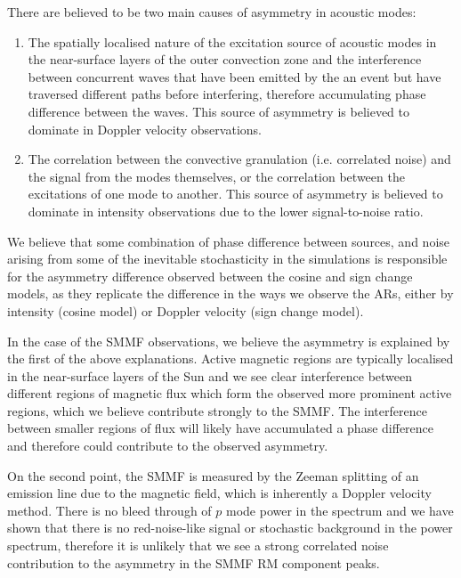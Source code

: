 There are believed to be two main causes of asymmetry in acoustic modes:

\begin{enumerate}
	\item{The spatially localised nature of the excitation source of acoustic modes in the near-surface layers of the outer convection zone and the interference between concurrent waves that have been emitted by the an event but have traversed different paths before interfering, therefore accumulating phase difference between the waves. This source of asymmetry is believed to dominate in Doppler velocity observations.}
	
	\item{The correlation between the convective granulation (i.e. correlated noise) and the signal from the modes themselves, or the correlation between the excitations of one mode to another. This source of asymmetry is believed to dominate in intensity observations due to the lower signal-to-noise ratio.}
\end{enumerate}

We believe that some combination of phase difference between sources, and noise arising from some of the inevitable stochasticity in the simulations is responsible for the asymmetry difference observed between the cosine and sign change models, as they replicate the difference in the ways we observe the ARs, either by intensity (cosine model) or Doppler velocity (sign change model).

In the case of the SMMF observations, we believe the asymmetry is explained by the first of the above explanations. Active magnetic regions are typically localised in the near-surface layers of the Sun and we see clear interference between different regions of magnetic flux which form the observed more prominent active regions, which we believe contribute strongly to the SMMF. The interference between smaller regions of flux will likely have accumulated a phase difference and therefore could contribute to the observed asymmetry. 

On the second point, the SMMF is measured by the Zeeman splitting of an emission line due to the magnetic field, which is inherently a Doppler velocity method. There is no bleed through of $p$ mode power in the spectrum and we have shown that there is no red-noise-like signal or stochastic background in the power spectrum, therefore it is unlikely that we see a strong correlated noise contribution to the asymmetry in the SMMF RM component peaks.

